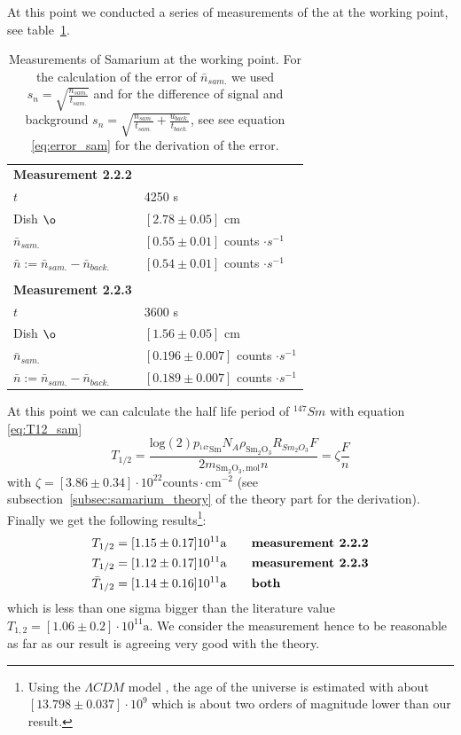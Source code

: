 At this point we conducted a series of measurements of the at the working point, see table~\ref{tab:mes1}.
\begin{table}
    \caption{Measurements of Samarium at the working point. For the calculation
    of the error of $\bar{n}_{sam.}$ we used $s_n = \sqrt{\frac{n_{sam.}}{t_{sam.}}}$ and for the difference
    of signal and background $s_n = \sqrt{\frac{n_{sam.}}{t_{sam.}}+\frac{u_{back.}}{t_{back.}} }$, see see equation \eqref{eq:error_sam} for
    the derivation of the error.}
    \begin{tabular}{l l}
        \textbf{Measurement 2.2.2} \\
        \rowcolor{tabcolor}$t$ & 4250 s \\ 
        Dish $\o$ & $\left [ 2.78 \pm 0.05 \right ]$ cm \\ 
        \rowcolor{tabcolor}$\bar{n}_{sam.}$ & $\left [ 0.55 \pm 0.01 \right ] $ counts $\cdot s^{-1}$ \\ 
    $\bar{n} := \bar{n}_{sam.} - \bar{n}_{back.}$ & $\left [ 0.54 \pm 0.01 \right ] $ counts $\cdot s^{-1}$ \\ \\
        \textbf{Measurement 2.2.3} \\
        \rowcolor{tabcolor}$t$ & 3600 s \\ 
        Dish $\o$ & $\left [ 1.56 \pm 0.05 \right ]$ cm \\ 
        \rowcolor{tabcolor}$\bar{n}_{sam.}$ & $\left [ 0.196 \pm 0.007 \right ] $ counts $\cdot s^{-1}$ \\ 
        $\bar{n} := \bar{n}_{sam.} - \bar{n}_{back.}$ & $\left [ 0.189 \pm 0.007 \right ] $ counts $\cdot s^{-1}$ \\ 
    \end{tabular}
    \label{tab:mes1}
\end{table}
At this point we can calculate the half life period of $^{147}Sm$ with equation \eqref{eq:T12_sam}
\begin{equation*}
T_{1/2} = \frac{\mathrm{log}(2)p_{\mathrm{^{147}Sm}} 
 N_A \rho_{\mathrm{Sm_2O_3}}R_{Sm_2O_3}F}{2m_{\mathrm{Sm_2O_3, mol}}n } = \zeta \frac{F}{n} 
\end{equation*}
with $\zeta=[3.86\pm0.34]\cdot10^{22} \mathrm{counts \cdot cm^{-2}}$
(see subsection~\ref{subsec:samarium_theory} of the theory part for the derivation). Finally we get the
following results\footnote{%
Using the $\Lambda CDM$ model \cite{Planck13}, 
the age of the universe is estimated with about $[13.798\pm0.037]\cdot 10^9$
which is about two orders of magnitude lower than our result. 
}:
\begin{align}
T_{1/2} &= [1.15\pm0.17]10^{11}\mathrm{a} \qquad \text{\textbf{measurement 2.2.2}}\\ 
T_{1/2} &= [1.12\pm0.17]10^{11}\mathrm{a} \qquad \text{\textbf{measurement 2.2.3}}\\
\bar{T}_{1/2} &= [1.14\pm0.16]10^{11}\mathrm{a} \qquad \text{\textbf{both}}
\end{align}
which is less than one sigma bigger than the literature value $T_{1,2} =[1.06\pm0.2]\cdot10^{11} \mathrm{a}$.
We consider the measurement hence to be reasonable as far as our result is agreeing very good with the theory.
